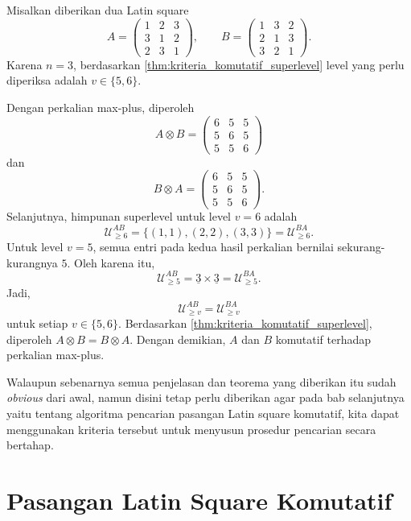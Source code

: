 \begin{contoh}\label{contoh:kriteria_komutatif_superlevel}
  Misalkan diberikan dua Latin square
  \[
    A=
    \begin{pmatrix}
      1 & 2 & 3 \\
      3 & 1 & 2 \\
      2 & 3 & 1
    \end{pmatrix},
    \qquad
    B=
    \begin{pmatrix}
      1 & 3 & 2 \\
      2 & 1 & 3 \\
      3 & 2 & 1
    \end{pmatrix}.
  \]
  Karena $n=3$, berdasarkan \autoref{thm:kriteria_komutatif_superlevel}
  level yang perlu diperiksa adalah $v\in\{5,6\}$.

  Dengan perkalian max-plus, diperoleh
  \[
    A\otimes B
    =
    \begin{pmatrix}
      6 & 5 & 5 \\
      5 & 6 & 5 \\
      5 & 5 & 6
    \end{pmatrix}
  \]
  dan
  \[
    B\otimes A
    =
    \begin{pmatrix}
      6 & 5 & 5 \\
      5 & 6 & 5 \\
      5 & 5 & 6
    \end{pmatrix}.
  \]
  Selanjutnya, himpunan superlevel untuk level $v=6$ adalah
  \[
    \mathcal{U}_{\ge 6}^{AB}
    =
    \{(1,1),(2,2),(3,3)\}
    =
    \mathcal{U}_{\ge 6}^{BA}.
  \]
  Untuk level $v=5$, semua entri pada kedua hasil perkalian bernilai
  sekurang-kurangnya $5$. Oleh karena itu,
  \[
    \mathcal{U}_{\ge 5}^{AB}
    =
    \underline{3}\times\underline{3}
    =
    \mathcal{U}_{\ge 5}^{BA}.
  \]
  Jadi,
  \[
    \mathcal{U}_{\ge v}^{AB}
    =
    \mathcal{U}_{\ge v}^{BA}
  \]
  untuk setiap $v\in\{5,6\}$. Berdasarkan
  \autoref{thm:kriteria_komutatif_superlevel}, diperoleh
  $A\otimes B=B\otimes A$. Dengan demikian, $A$ dan $B$ komutatif terhadap
  perkalian max-plus.
\end{contoh}

Walaupun sebenarnya semua penjelasan dan teorema yang diberikan itu sudah \textit{obvious} dari awal, namun disini tetap perlu diberikan agar pada bab selanjutnya yaitu tentang algoritma pencarian pasangan Latin square komutatif, kita dapat menggunakan kriteria tersebut untuk menyusun prosedur pencarian secara bertahap.

\section{Pasangan Latin Square Komutatif}

